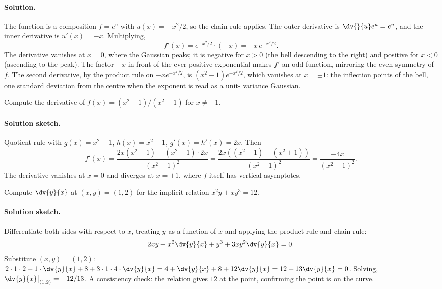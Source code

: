 \paragraph{Solution.}
The function is a composition $f = e^{u}$ with $u(x) = -x^{2}/2$, so
the chain rule applies. The outer derivative is $\dv{}{u} e^{u} =
e^{u}$, and the inner derivative is $u'(x) = -x$. Multiplying,
\[
f'(x) = e^{-x^{2}/2} \cdot (-x) = -x \, e^{-x^{2}/2}.
\]
The derivative vanishes at $x = 0$, where the Gaussian peaks; it is
negative for $x > 0$ (the bell descending to the right) and positive
for $x < 0$ (ascending to the peak). The factor $-x$ in front of the
ever-positive exponential makes $f'$ an odd function, mirroring the
even symmetry of $f$. The second derivative, by the product rule on
$-x e^{-x^{2}/2}$, is $(x^{2} - 1) e^{-x^{2}/2}$, which vanishes at
$x = \pm 1$: the inflection points of the bell, one standard
deviation from the centre when the exponent is read as a unit-
variance Gaussian.

\begin{exercise}
Compute the derivative of $f(x) = (x^{2} + 1)/(x^{2} - 1)$ for
$x \neq \pm 1$.
\end{exercise}

\paragraph{Solution sketch.}
Quotient rule with $g(x) = x^{2} + 1$, $h(x) = x^{2} - 1$,
$g'(x) = h'(x) = 2 x$. Then
\[
f'(x) = \frac{2 x (x^{2} - 1) - (x^{2} + 1) \cdot 2 x}
{(x^{2} - 1)^{2}} = \frac{2 x ((x^{2} - 1) - (x^{2} + 1))}
{(x^{2} - 1)^{2}} = \frac{-4 x}{(x^{2} - 1)^{2}}.
\]
The derivative vanishes at $x = 0$ and diverges at $x = \pm 1$,
where $f$ itself has vertical asymptotes.

\begin{exercise}
Compute $\dv{y}{x}$ at $(x, y) = (1, 2)$ for the implicit
relation $x^{2} y + x y^{3} = 12$.
\end{exercise}

\paragraph{Solution sketch.}
Differentiate both sides with respect to $x$, treating $y$ as a
function of $x$ and applying the product rule and chain rule:
\[
2 x y + x^{2} \dv{y}{x} + y^{3} + 3 x y^{2} \dv{y}{x} = 0.
\]
Substitute $(x, y) = (1, 2)$: $2 \cdot 1 \cdot 2 + 1 \cdot
\dv{y}{x} + 8 + 3 \cdot 1 \cdot 4 \cdot \dv{y}{x} = 4 + \dv{y}{x}
+ 8 + 12 \dv{y}{x} = 12 + 13 \dv{y}{x} = 0$. Solving,
$\dv{y}{x}\big|_{(1,2)} = -12/13$. A consistency check: the
relation gives $12$ at the point, confirming the point is on the
curve.

